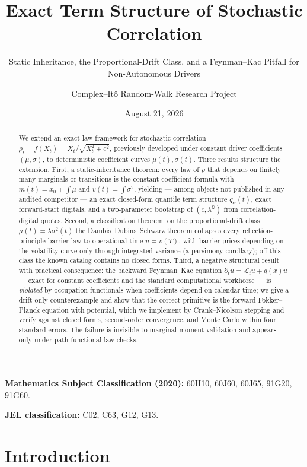 \documentclass[
  english,
  10pt,
  letterpaper,
  DIV=11,
  numbers=noendperiod]{scrartcl}
\title{Exact Term Structure of Stochastic Correlation}
\subtitle{Static Inheritance, the Proportional-Drift Class, and a
Feynman--Kac Pitfall for Non-Autonomous Drivers}
\author{Complex--Itô Random-Walk Research Project}
\date{August 21, 2026}
\renewcommand*\contentsname{Table of contents}
\newcommand\contentsname{Table of contents}
\begin{document}
\maketitle
\begin{abstract}
We extend an exact-law framework for stochastic correlation
\(\rho_t=f(X_t)=X_t/\sqrt{X_t^2+c^2}\), previously developed under
constant driver coefficients \((\mu,\sigma)\), to deterministic
coefficient curves \(\mu(t),\sigma(t)\). Three results structure the
extension. First, a static-inheritance theorem: every law of \(\rho\)
that depends on finitely many marginals or transitions is the
constant-coefficient formula with \(m(t)=x_0+\int\mu\) and
\(v(t)=\int\sigma^2\), yielding --- among objects not published in any
audited competitor --- an exact closed-form quantile term structure
\(q_\alpha(t)\), exact forward-start digitals, and a two-parameter
bootstrap of \((c,\lambda^{\mathbb Q})\) from correlation-digital
quotes. Second, a classification theorem: on the proportional-drift
class \(\mu(t)=\lambda\sigma^2(t)\) the Dambis--Dubins--Schwarz theorem
collapses every reflection-principle barrier law to operational time
\(u=v(T)\), with barrier prices depending on the volatility curve only
through integrated variance (a parsimony corollary); off this class the
known catalog contains no closed forms. Third, a negative structural
result with practical consequence: the backward Feynman--Kac equation
\(\partial_tu=\mathcal L_tu+q(x)u\) --- exact for constant coefficients
and the standard computational workhorse --- is \emph{violated} by
occupation functionals when coefficients depend on calendar time; we
give a drift-only counterexample and show that the correct primitive is
the forward Fokker--Planck equation with potential, which we implement
by Crank--Nicolson stepping and verify against closed forms,
second-order convergence, and Monte Carlo within four standard errors.
The failure is invisible to marginal-moment validation and appears only
under path-functional law checks.
\end{abstract}

\renewcommand*\contentsname{Table of contents}
{
\setcounter{tocdepth}{2}
\tableofcontents
}

\textbf{Mathematics Subject Classification (2020):} 60H10, 60J60, 60J65,
91G20, 91G60.

\textbf{JEL classification:} C02, C63, G12, G13.

\section{Introduction}\label{sec-introduction}
\end{document}
